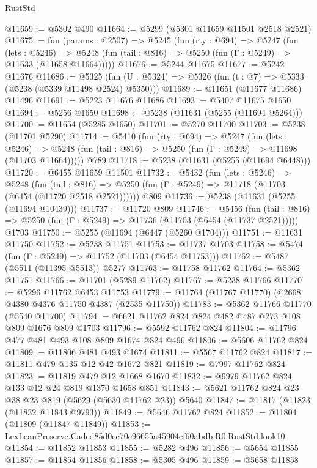 \begin{lexlean}{RustStd}
\begin{coremodule}
@11659 := @5302 @490
@11664 := @5299 (@5301 @11659 @11501 @2518 @2521)
@11675 := fun (params : @2507) =>
  @5245
    (fun (rty : @694) =>
    @5247
      (fun (lets : @5246) =>
      @5248 (fun (tail : @816) => @5250 (fun (Γ : @5249) => @11633 (@11658 @11664)))))
@11676 := @5244 @11675
@11677 := @5242 @11676
@11686 := @5325
    (fun (U : @5324) => @5326 (fun (t : @7) => @5333 (@5238 (@5339 @11498 @2524) @5350)))
@11689 := @11651 (@11677 @11686) @11496
@11691 := @5223 @11676 @11686
@11693 := @5407 @11675 @1650
@11694 := @5256 @1650
@11698 := @5238 (@11631 (@5255 (@11694 @5264)))
@11700 := @11654 (@5285 @1650)
@11701 := @5270 @11700
@11703 := @5238 (@11701 @5290)
@11714 := @5410
    (fun (rty : @694) =>
    @5247
      (fun (lets : @5246) =>
      @5248 (fun (tail : @816) => @5250 (fun (Γ : @5249) => @11698 (@11703 @11664)))))
    @789
@11718 := @5238 (@11631 (@5255 (@11694 @6448)))
@11720 := @6455 @11659 @11501
@11732 := @5432
    (fun (lets : @5246) =>
    @5248
      (fun (tail : @816) =>
      @5250 (fun (Γ : @5249) => @11718 (@11703 (@6454 (@11720 @2518 @2521))))))
    @809
@11736 := @5238 (@11631 (@5255 (@11694 @10439)))
@11737 := @11720 @809
@11746 := @5456
    (fun (tail : @816) => @5250 (fun (Γ : @5249) => @11736 (@11703 (@6454 (@11737 @2521)))))
    @1703
@11750 := @5255 (@11694 (@6447 (@5260 @1704)))
@11751 := @11631 @11750
@11752 := @5238 @11751
@11753 := @11737 @1703
@11758 := @5474 (fun (Γ : @5249) => @11752 (@11703 (@6454 @11753)))
@11762 := @5487 (@5511 (@11395 @5513)) @5277
@11763 := @11758 @11762
@11764 := @5362 @11751
@11766 := @11701 (@5289 @11762)
@11767 := @5238 @11766
@11770 := @5296 @11762 @6453 @11753
@11779 := @11764 (@11767 @11770) (@2668 @4380 @4376 @11750 @4387 (@2535 @11750))
@11783 := @5362 @11766 @11770 (@5540 @11700)
@11794 := @6621 @11762 @824 @824 @482 @487 @273 @108 @809 @1676 @809 @1703
@11796 := @5592 @11762 @824
@11804 := @11796 @477 @481 @493 @108 @809 @1674 @824 @496
@11806 := @5606 @11762 @824
@11809 := @11806 @481 @493 @1674
@11811 := @5567 @11762 @824
@11817 := @11811 @479 @135 @12 @42 @1672 @821
@11819 := @7997 @11762 @824
@11823 := @11819 @479 @12 @1668 @1670
@11832 := @9979 @11762 @824 @133 @12 @24 @819 @1370 @1658 @851
@11843 := @5621 @11762 @824 @23 @38 @23 @819 (@5629 (@5630 @11762 @23)) @5640
@11847 := @11817 (@11823 (@11832 @11843 @9793))
@11849 := @5646 @11762 @824
@11852 := @11804 (@11809 (@11847 @11849))
@11853 := LexLeanPreserve.Caded85d0ec70c96655a45904ef60abdb.R0.RustStd.look10
@11854 := @11852 @11853
@11855 := @5282 @496
@11856 := @5654 @11855
@11857 := @11854 @11856
@11858 := @5305 @496
@11859 := @5658 @11858

\end{coremodule}
\end{lexlean}
